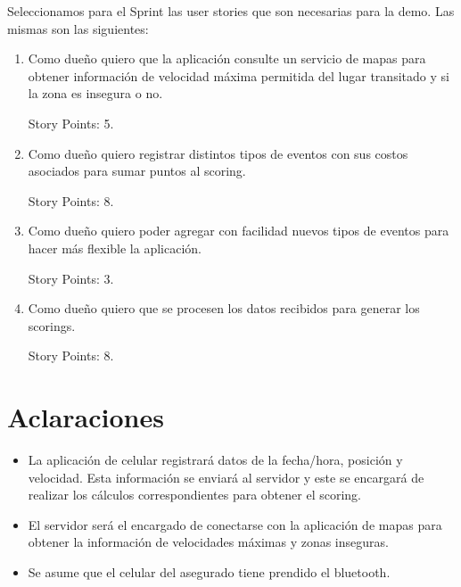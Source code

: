 Seleccionamos para el Sprint las user stories que son necesarias para la demo. 
Las mismas son las siguientes:
\begin{enumerate}
\item Como dueño quiero que la aplicación consulte un servicio de mapas para obtener información de velocidad máxima permitida del lugar transitado y si la zona es insegura o no. 

Story Points: 5.

\item Como dueño quiero registrar distintos tipos de eventos con sus costos asociados para sumar puntos al 
scoring. 

Story Points: 8.

\item Como dueño quiero poder agregar con facilidad nuevos tipos de eventos para hacer más flexible la 
aplicación. 

Story Points: 3.

\item Como dueño quiero que se procesen los datos recibidos para generar los scorings.

Story Points: 8.

\end{enumerate}

\section{Aclaraciones}
\begin{itemize}
\item La aplicación de celular registrará datos de la fecha/hora, posición y velocidad. Esta información se enviará al servidor y este se encargará de realizar los cálculos correspondientes para obtener el scoring.
\item El servidor será el encargado de conectarse con la aplicación de mapas para obtener la información de velocidades máximas y zonas inseguras.
\item Se asume que el celular del asegurado tiene prendido el bluetooth.
\end{itemize}
